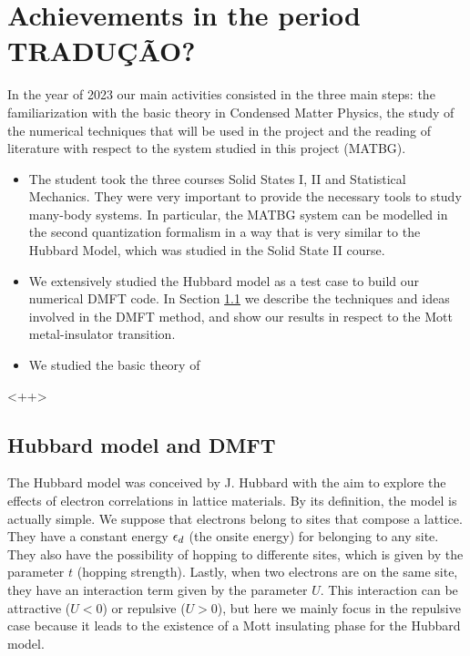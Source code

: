 \documentclass[12pt]{report}
\begin{document}
\chapter{Achievements in the period \textbf{TRADUÇÃO?}}

In the year of 2023 our main activities consisted in the three main steps: the familiarization with the basic theory in Condensed Matter Physics, the study of the numerical techniques that will be used in the project and the reading of literature with respect to the system studied in this project (MATBG).

\begin{itemize}
\item The student took the three courses Solid States I, II and Statistical Mechanics. They were very important to provide the necessary tools to study many-body systems. In particular, the MATBG system can be modelled in the second quantization formalism in a way that is very similar to the Hubbard Model, which was studied in the Solid State II course.

\item We extensively studied the Hubbard model \cite{hubbard1963} as a test case to build our numerical DMFT code. In Section \ref{sec:dmft} we describe the techniques and ideas involved in the DMFT method, and show our results in respect to the Mott metal-insulator transition.

\item We studied the basic theory of
\end{itemize}
<++>

\section{Hubbard model and DMFT} \label{sec:dmft}


The Hubbard model was conceived by J. Hubbard with the aim to explore the effects of electron correlations in lattice materials. By its definition, the model is actually simple. We suppose that electrons belong to sites that compose a lattice. They have a constant energy $\epsilon_d$ (the onsite energy) for belonging to any site. They also have the possibility of hopping to differente sites, which is given by the parameter $t$ (hopping strength). Lastly, when two electrons are on the same site, they have an interaction term given by the parameter $U$. This interaction can be attractive ($U < 0$) or repulsive ($U > 0$), but here we mainly focus in the repulsive case because it leads to the existence of a Mott insulating phase \cite{georges1996} for the Hubbard model.
\end{document}

